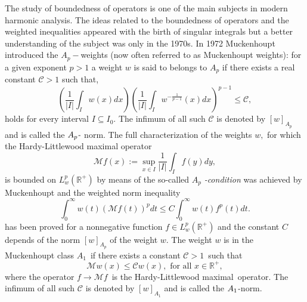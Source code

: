 \documentclass[a4paper]{amsart}
\theoremstyle{plain}
\numberwithin{equation}{section}
\begin{document}
The study of boundedness of operators is one of the main subjects in modern
harmonic analysis. The ideas related to the boundedness of operators and the
weighted inequalities appeared with the birth of singular integrals but a
better understanding of the subject was only in the 1970s. In 1972
Muckenhoupt \cite{M} introduced the $A_{p}-$weights (now often referred to
as Muckenhoupt weights): for a given exponent $p>1$ a weight $w$ is said to
belongs to $A_{p}$ if there exists a real constant $\mathcal{C}>1$ such
that, 
\begin{equation}
\left( \frac{1}{\left\vert I\right\vert }\int_{I}w(x)dx\right) \left( \frac{1%
}{\left\vert I\right\vert }\int_{I}w^{-\frac{1}{p-1}}(x)dx\right) ^{p-1}\leq 
\mathcal{C},  \label{Ap}
\end{equation}%
holds for every interval $I\subseteq I_{0}$. The infimum of all such $%
\mathcal{C}$ is denoted by $[w]_{A_{p}}$ and is called the $A_{p}\emph{-}$%
norm. The full characterization of the weights $w,$ for which the
Hardy-Littlewood maximal operator%
\begin{equation}
\mathcal{M}f(x):=\sup_{x\in I}\frac{1}{\left\vert I\right\vert }%
\int_{I}f(y)dy,  \label{hl}
\end{equation}%
is bounded on $L_{w}^{p}(\mathbb{R}^{+})$ by means of the so-called $A_{p}$%
\emph{-condition} was achieved by Muckenhoupt and the weighted norm
inequality%
\begin{equation}
\int_{0}^{\infty }w(t)\left( \mathcal{M}f(t)\right) ^{p}dt\leq
C\int_{0}^{\infty }w(t)f^{p}(t)dt.  \label{discrete hardy3}
\end{equation}%
has been proved for a nonnegative function $f\in L_{w}^{p}(\mathbb{R}^{+})$
and the constant $C$ depends of the norm $[w]_{A_{p}}$ of the weight $w.$
The weight $w$ is in the Muckenhoupt class $A_{1}$\ if there exists a
constant $\mathcal{C}>1$\ such that%
\begin{equation}
\mathcal{M}w(x)\leq \mathcal{C}w(x),\text{ \ for all }x\in \mathbb{R}^{+},
\label{1}
\end{equation}%
where the operator $f\rightarrow \mathcal{M}f$\ is the Hardy-Littlewood
maximal\ operator. The infimum of all such $\mathcal{C}$ is denoted by $%
[w]_{A_{1}}$ and is called the $A_{1}\emph{-}$norm.
\end{document}
